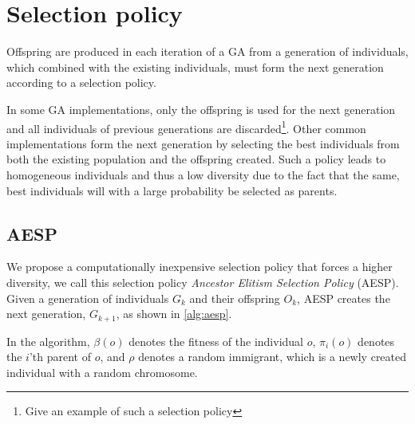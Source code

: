 \section{Selection policy}
Offspring are produced in each iteration of a GA from a generation of individuals, which combined with the existing individuals, must form the next generation according to a selection policy.

In some GA implementations, only the offspring is used for the next generation and all individuals of previous generations are discarded\footnote{ Give an example of such a selection policy}. Other common implementations form the next generation by selecting the best individuals from both the existing population and the offspring created\cite{masterThesisGANN}. Such a policy leads to homogeneous individuals and thus a low diversity due to the fact that the same, best individuals will with a large probability be selected as parents.

\subsection{AESP}
We propose a computationally inexpensive selection policy that forces a higher diversity, we call this selection policy \emph{Ancestor Elitism Selection Policy} (AESP). Given a generation of individuals $G_k$ and their offspring $O_k$, AESP creates the next generation, $G_{k+1}$, as shown in \cref{alg:aesp}.
%

%
In the algorithm, $\beta(o)$ denotes the fitness of the individual $o$, $\pi_i(o)$ denotes the $i$'th parent of $o$, and $\rho$ denotes a random immigrant, which is a newly created individual with a random chromosome.
